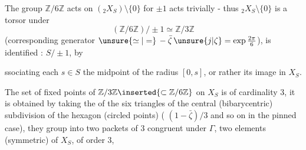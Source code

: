 
The group $\mathbb Z/6\mathbb Z$ acts  on $({}_2X_S)\setminus\{0\}$ for $\pm1$ acts trivially - thus ${}_2X_S\setminus\{0\}$ is a torsor under
\[
(\mathbb Z/6\mathbb Z)/\pm1\simeq\mathbb Z/3\mathbb Z
\]
 (corresponding generator $\unsure{\simeq|=}\,-\bar\zeta\,\unsure{j|\zeta}=\exp\frac{2\pi}{6}$),
  is identified : $S/\pm1$, by
ssociating  each $s\in S$ the midpoint of the radius $[0,s]$, or rather its image in\inserted{)} $X_S$.

The set of fixed points of $\mathbb Z/3\mathbb Z\inserted{\subset\mathbb Z/6\mathbb Z}$ on $X_S$ is of cardinality 3, it is obtained by taking the  of the six triangles of the central (bibarycentric) subdivision of the hexagon (circled points) ( $(1-\bar\zeta)/3$ and so on in the pinned case), they group into two packets of 3  congruent under $\Gamma$,  two elements (symmetric) of $X_S$, of order 3,

